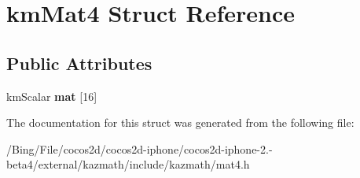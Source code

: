 \hypertarget{structkm_mat4}{\section{km\-Mat4 Struct Reference}
\label{structkm_mat4}
}
\subsection*{Public Attributes}
\begin{DoxyCompactItemize}
\item 
\hypertarget{structkm_mat4_a39a393fbd31604045d69a6af0fa3b34a}{km\-Scalar {\bfseries mat} \mbox{[}16\mbox{]}}\label{structkm_mat4_a39a393fbd31604045d69a6af0fa3b34a}

\end{DoxyCompactItemize}


The documentation for this struct was generated from the following file\-:\begin{DoxyCompactItemize}
\item 
/\-Bing/\-File/cocos2d/cocos2d-\/iphone/cocos2d-\/iphone-\/2.-\/beta4/external/kazmath/include/kazmath/mat4.\-h\end{DoxyCompactItemize}
